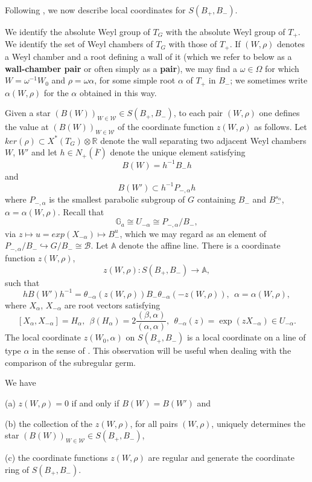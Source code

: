 \documentclass[12pt,letterpaper]{amsart}
\newcommand{\ovF}{\overline{F}}
\newcommand{\aaa}{\mathbb{A}}
\newcommand{\rrr}{\mathbb{R}}
\newcommand{\gga}{\mathbb{G}}
\begin{document}
Following \cite{La83}, we now describe local coordinates for
$S(B_+,B_-)$.

We identify the absolute Weyl group of $T_G$ with the absolute
Weyl group of
$T_+$.
We identify the set of Weyl chambers of $T_G$ with those of $T_+$.
If $(W,\rho)$ denotes a Weyl chamber and a
root defining a wall
of it (which we refer to below as a \textbf{wall-chamber pair}
or often simply as a \textbf{pair}),
we may find a $\omega\in\Omega$ for which
$W=\omega^{-1}W_0$ and $\rho=\omega \alpha$, for some
simple root $\alpha$ of $T_+$ in $B_-$;
we sometimes write $\alpha(W,\rho)$ for
the $\alpha$ obtained in this way.

Given a star $(B(W))_{W\in{\mathcal W}}\in S(B_+,B_-)$,
to each pair $(W,\rho)$ one defines
the value at $(B(W))_{W\in{\mathcal W}}$ of the coordinate
function $z(W,\rho)$ as follows. Let $ker(\rho)
\subset X^*(T_G)\otimes {\rrr}$
denote the wall separating two adjacent Weyl chambers
$W$, $W'$ and let $h\in N_+(\ovF)$ denote the unique element
satisfying
\[
B(W)=h^{-1}B_-h
\]
and
\[
B(W')\subset h^{-1}P_{-,\alpha} h
\]
where $P_{-,\alpha}$ is the smallest parabolic subgroup
of $G$ containing $B_-$ and $B_-^{s_\alpha}$, $\alpha
=\alpha (W,\rho)$.
Recall that
\[
\gga_a\cong U_{-\alpha}\cong P_{-,\alpha}/B_-,
\]
via $z\longmapsto u=exp(X_{-\alpha})\longmapsto B_-^u$, which we may
regard as an element of $P_{-,\alpha}/B_-\hookrightarrow G/B_-\cong {\mathcal B}$.
Let ${\mathbb A}$ denote the affine line.
There is a coordinate function $z(W,\rho)$,
\[
z(W,\rho):S(B_+,B_-)\rightarrow \aaa,
\]
such that
\[
hB(W')h^{-1}=\theta_{-\alpha} (z(W,\rho))B_-\theta_{-\alpha} (-z(W,\rho)),
\ \ \alpha=\alpha(W,\rho),
\tag{1.8}
\]
where $X_\alpha$, $X_{-\alpha}$ are root vectors satisfying
\[
[X_\alpha, X_{-\alpha}]=H_\alpha,\ \
\beta(H_{\alpha})=2\frac{(\beta,\alpha)}{(\alpha,\alpha)},\ \
\theta_{-\alpha}(z)=\exp(zX_{-\alpha})\in U_{-\alpha}.
\]
The local coordinate $z(W_0,\alpha)$ on $S(B_+,B_-)$ is
a local coordinate on a line of type $\alpha$ in the sense
of \cite{St74}. This observation will be useful when dealing with the
comparison of the subregular germ.

We have

(a) $z(W,\rho)=0$ if and only if $B(W)=B(W')$ and

(b) the collection of the $z(W,\rho)$, for all pairs $(W,\rho)$,
uniquely determines the star $(B(W))_{W\in{\mathcal W}}\in S(B_+,B_-)$,

(c) the coordinate functions $z(W,\rho)$ are regular and generate
the coordinate ring of $S(B_+,B_-)$.
\end{document}

